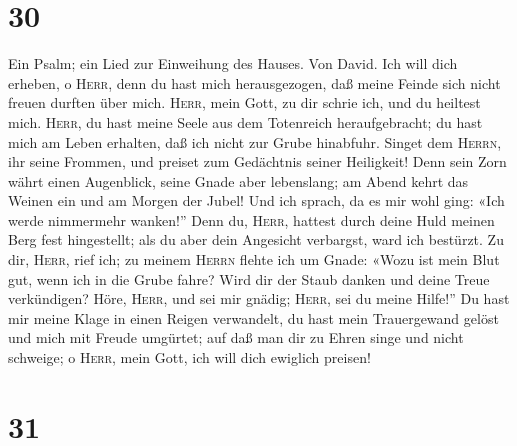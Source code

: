 \hypertarget{section-29}{%
\section{30}\label{section-29}}

 Ein Psalm; ein Lied zur Einweihung des Hauses. Von David.
Ich will dich erheben, o \textsc{Herr}, denn du hast mich herausgezogen,
daß meine Feinde sich nicht freuen durften über mich. 
\textsc{Herr}, mein Gott, zu dir schrie ich, und du heiltest mich.
 \textsc{Herr}, du hast meine Seele aus dem Totenreich
heraufgebracht; du hast mich am Leben erhalten, daß ich nicht zur Grube
hinabfuhr.  Singet dem \textsc{Herrn}, ihr seine Frommen,
und preiset zum Gedächtnis seiner Heiligkeit!  Denn sein
Zorn währt einen Augenblick, seine Gnade aber lebenslang; am Abend kehrt
das Weinen ein und am Morgen der Jubel!  Und ich sprach,
da es mir wohl ging: «Ich werde nimmermehr wanken!''  Denn
du, \textsc{Herr}, hattest durch deine Huld meinen Berg fest
hingestellt; als du aber dein Angesicht verbargst, ward ich bestürzt.
 Zu dir, \textsc{Herr}, rief ich; zu meinem \textsc{Herrn}
flehte ich um Gnade:  «Wozu ist mein Blut gut, wenn ich in
die Grube fahre? Wird dir der Staub danken und deine Treue verkündigen?
 Höre, \textsc{Herr}, und sei mir gnädig; \textsc{Herr},
sei du meine Hilfe!''  Du hast mir meine Klage in einen
Reigen verwandelt, du hast mein Trauergewand gelöst und mich mit Freude
umgürtet;  auf daß man dir zu Ehren singe und nicht
schweige; o \textsc{Herr}, mein Gott, ich will dich ewiglich preisen!

\hypertarget{section-30}{%
\section{31}\label{section-30}}

